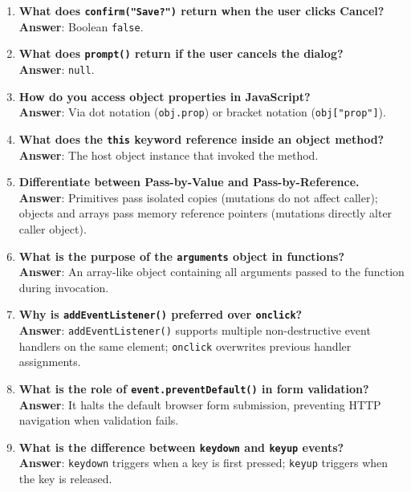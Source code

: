 \begin{enumerate}[leftmargin=1.5em]
    \item \textbf{What does \texttt{confirm("Save?")} return when the user clicks Cancel?}\\
    \textbf{Answer}: Boolean \texttt{false}.

    \item \textbf{What does \texttt{prompt()} return if the user cancels the dialog?}\\
    \textbf{Answer}: \texttt{null}.

    \item \textbf{How do you access object properties in JavaScript?}\\
    \textbf{Answer}: Via dot notation (\texttt{obj.prop}) or bracket notation (\texttt{obj["prop"]}).

    \item \textbf{What does the \texttt{this} keyword reference inside an object method?}\\
    \textbf{Answer}: The host object instance that invoked the method.

    \item \textbf{Differentiate between Pass-by-Value and Pass-by-Reference.}\\
    \textbf{Answer}: Primitives pass isolated copies (mutations do not affect caller); objects and arrays pass memory reference pointers (mutations directly alter caller object).

    \item \textbf{What is the purpose of the \texttt{arguments} object in functions?}\\
    \textbf{Answer}: An array-like object containing all arguments passed to the function during invocation.

    \item \textbf{Why is \texttt{addEventListener()} preferred over \texttt{onclick}?}\\
    \textbf{Answer}: \texttt{addEventListener()} supports multiple non-destructive event handlers on the same element; \texttt{onclick} overwrites previous handler assignments.

    \item \textbf{What is the role of \texttt{event.preventDefault()} in form validation?}\\
    \textbf{Answer}: It halts the default browser form submission, preventing HTTP navigation when validation fails.

    \item \textbf{What is the difference between \texttt{keydown} and \texttt{keyup} events?}\\
    \textbf{Answer}: \texttt{keydown} triggers when a key is first pressed; \texttt{keyup} triggers when the key is released.


\end{enumerate}
